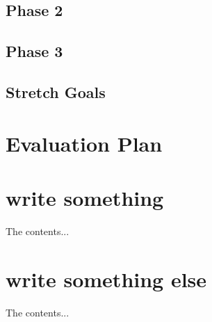 \documentclass[12pt,titlepage]{article}
\begin{document}
\subsection{Phase 2}
\subsection{Phase 3}
\subsection{Stretch Goals}

\newpage
\section{Evaluation Plan}



\newpage
{}




\newpage

\begin{appendices}
\section{write something}
The contents...
\section{write something else}
The contents...
\end{appendices}
\end{document}
